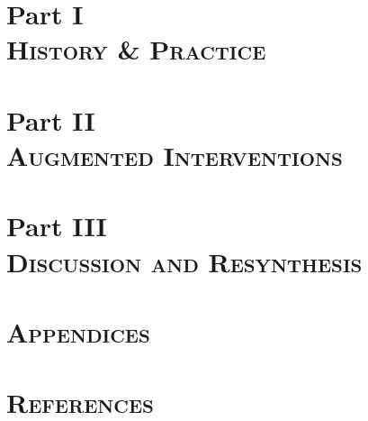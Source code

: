 \documentclass[a4paper,11pt,oneside,oldfontcommands]{memoir} %
\begin{document}
  \part*{Part I\\\textsc{History \& Practice}}\label{sec: history-practice}
  \clearpage 
  \clearpage
  \clearpage
  \newpage
  \part*{Part II\\\textsc{Augmented Interventions}}\label{sec: augmented-interventions}
  \clearpage
  \clearpage
  \clearpage
  \clearpage
  \newpage
  \part*{Part III\\\textsc{Discussion and Resynthesis}}\label{sec: discussion-and-synthesis}
  \clearpage
  \clearpage
  \newpage
\endgroup

\setcounter{chapter}{0}

\begingroup
  \part*{\textsc{Appendices}}\label{sec: appendices}
  \newpage
  \appendix
  \clearpage
  \clearpage
  \clearpage
\endgroup

{}
\part*{\textsc{References}}\label{sec: references}
\newpage


\end{document}

